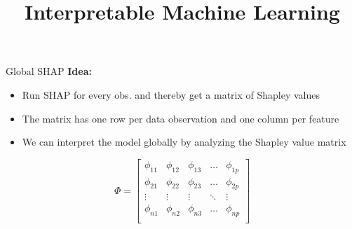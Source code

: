 \documentclass[10pt,compress,t,notes=noshow, xcolor=table]{beamer}
\title{Interpretable Machine Learning}
\date{}
\begin{document}


\begin{frame}{Global SHAP }
\textbf{Idea: }
\begin{itemize}
    \item Run SHAP for every obs. and thereby get a matrix of Shapley values
    \item The matrix has one row per data observation and one column per feature
    \item We can interpret the model globally by analyzing the Shapley value matrix
\end{itemize}
\vspace{2cm}
$$
\Phi =
\begin{bmatrix}
    \phi_{11} & \phi_{12} & \phi_{13} & \dots  & \phi_{1p} \\
    \phi_{21} & \phi_{22} & \phi_{23} & \dots  & \phi_{2p} \\
    \vdots & \vdots & \vdots & \ddots & \vdots \\
    \phi_{n1} & \phi_{n2} & \phi_{n3} & \dots  & \phi_{np} \\
\end{bmatrix}
$$

 \end{frame}
\end{document}
